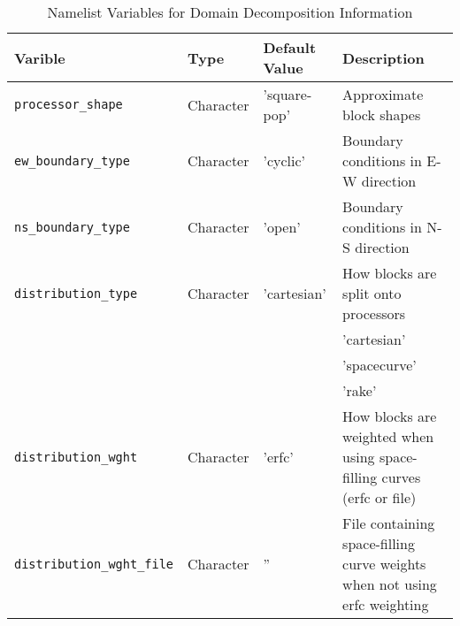\begin{table}
  \begin{center}
  \caption{Namelist Variables for Domain Decomposition Information}
  \label{table:domain_nml}
  \begin{tabular}{p{4.0cm}p{2cm}p{2cm}p{6.0cm}} \hline
  Varible & Type & Default Value & Description               \\
\hline \hline

{\tt processor\_shape} & Character & 'square-pop' & Approximate block shapes \\

{\tt ew\_boundary\_type} & Character & 'cyclic' & Boundary conditions in E-W direction\\

{\tt ns\_boundary\_type} & Character & 'open' & Boundary conditions in N-S direction\\

{\tt distribution\_type} & Character & 'cartesian' & How blocks are split onto processors \\
 & & & 'cartesian' \\
 & & & 'spacecurve' \\
 & & & 'rake' \\

{\tt distribution\_wght} & Character & 'erfc' & How blocks are weighted when using space-filling curves (erfc or file) \\

{\tt distribution\_wght\_file} & Character & '' & File containing space-filling curve weights when not using erfc weighting \\

  \hline
  \end{tabular}
  \end{center}
\end{table}

